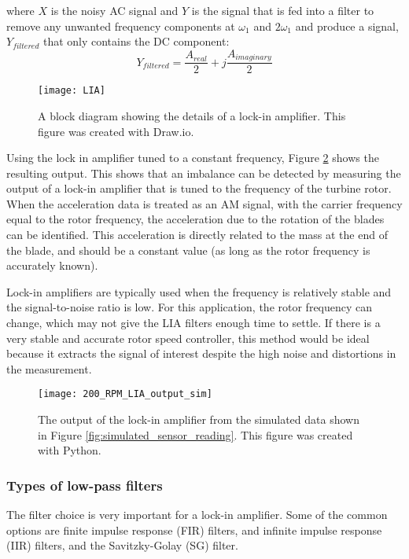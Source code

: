 where $X$ is the noisy AC signal and $Y$ is the signal that is fed into a filter to remove any unwanted frequency components at $\omega_1$ and $2 \omega_1$ and produce a signal, $Y_{filtered}$ that only contains the DC component:
\begin{equation}
	Y_{filtered} = \frac{A_{real}}{2} + j \frac{A_{imaginary}}{2}
\end{equation}

\begin{figure}
	\centering
	\texttt{[image: LIA]}
	\decoRule
	\caption{A block diagram showing the details of a lock-in amplifier.  This figure was created with Draw.io.}
	\label{fig:LIA}
\end{figure}

Using the lock in amplifier tuned to a constant frequency, Figure \ref{fig:200_RPM_LIA_output_sim} shows the resulting output.  This shows that an imbalance can be detected by measuring the output of a lock-in amplifier that is tuned to the frequency of the turbine rotor.  When the acceleration data is treated as an AM signal, with the carrier frequency equal to the rotor frequency, the acceleration due to the rotation of the blades can be identified.  This acceleration is directly related to the mass at the end of the blade, and should be a constant value (as long as the rotor frequency is accurately known).

Lock-in amplifiers are typically used when the frequency is relatively stable and the signal-to-noise ratio is low.  For this application, the rotor frequency can change, which may not give the LIA filters enough time to settle.  If there is a very stable and accurate rotor speed controller, this method would be ideal because it extracts the signal of interest despite the high noise and distortions in the measurement.

\begin{figure}
	\centering
	\texttt{[image: 200\_RPM\_LIA\_output\_sim]}
	\decoRule
	\caption{The output of the lock-in amplifier from the simulated data shown in Figure \ref{fig:simulated_sensor_reading}.  This figure was created with Python.}
	\label{fig:200_RPM_LIA_output_sim}
\end{figure}


\subsubsection{Types of low-pass filters}
The filter choice is very important for a lock-in amplifier.  Some of the common options are finite impulse response (FIR) filters, and infinite impulse response (IIR) filters, and the Savitzky-Golay (SG) filter.

